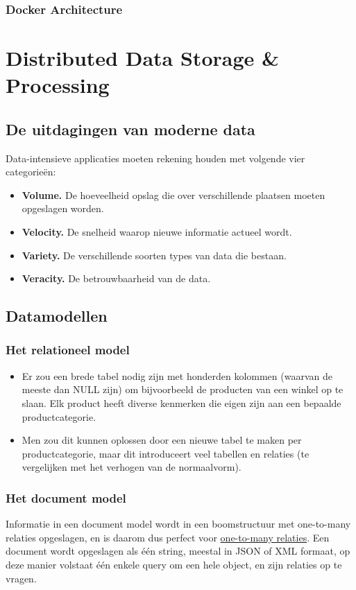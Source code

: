 \documentclass{report}
\begin{document}
	\section{Docker Architecture}
	

 
	\part{Distributed Data Storage \& Processing}
	\chapter{De uitdagingen van moderne data}
	Data-intensieve applicaties moeten rekening houden met volgende vier categorieën:
	\begin{itemize}
		\item \textbf{Volume.} De hoeveelheid opslag die over verschillende plaatsen moeten opgeslagen worden.
		\item \textbf{Velocity.} De snelheid waarop nieuwe informatie actueel wordt.
		\item \textbf{Variety.} De verschillende soorten types van data die bestaan. 
		\item \textbf{Veracity.} De betrouwbaarheid van de data. 
	\end{itemize}
	\chapter{Datamodellen}
	\section{Het relationeel model}
	\begin{itemize}
		\item Er zou een brede tabel nodig zijn met honderden kolommen (waarvan de meeste dan NULL zijn) om bijvoorbeeld de producten van een winkel op te slaan. Elk product heeft diverse kenmerken die eigen zijn aan een bepaalde productcategorie.
		\item Men zou dit kunnen oplossen door een nieuwe tabel te maken per productcategorie, maar dit introduceert veel tabellen en relaties (te vergelijken met het verhogen van de normaalvorm).
	\end{itemize}
	\section{Het document model}
	Informatie in een document model wordt in een boomstructuur met one-to-many relaties opgeslagen, en is daarom dus perfect voor \underline{one-to-many relaties}. Een document wordt opgeslagen als één string, meestal in JSON of XML formaat, op deze manier volstaat één enkele query om een hele object, en zijn relaties op te vragen. 
\end{document}
